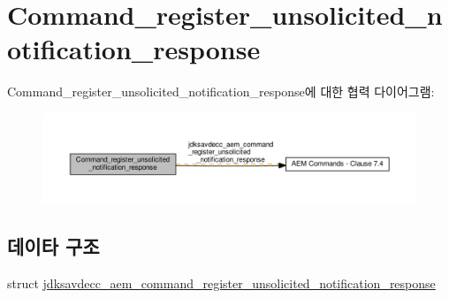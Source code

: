 \hypertarget{group__command__register__unsolicited__notification__response}{}\section{Command\+\_\+register\+\_\+unsolicited\+\_\+notification\+\_\+response}
\label{group__command__register__unsolicited__notification__response}
Command\+\_\+register\+\_\+unsolicited\+\_\+notification\+\_\+response에 대한 협력 다이어그램\+:
\nopagebreak
\begin{figure}[H]
\begin{center}
\leavevmode
\includegraphics[width=350pt]{group__command__register__unsolicited__notification__response}
\end{center}
\end{figure}
\subsection*{데이타 구조}
\begin{DoxyCompactItemize}
\item 
struct \hyperlink{structjdksavdecc__aem__command__register__unsolicited__notification__response}{jdksavdecc\+\_\+aem\+\_\+command\+\_\+register\+\_\+unsolicited\+\_\+notification\+\_\+response}
\end{DoxyCompactItemize}

